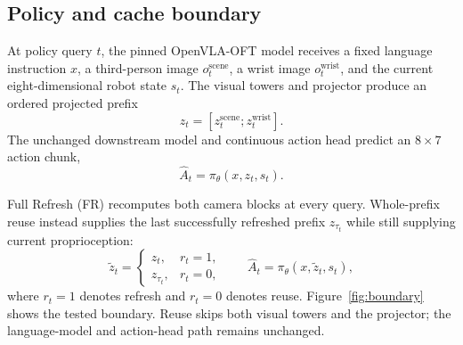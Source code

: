\documentclass[11pt]{article}
\newcommand{\FR}{\textsc{FR}}
\begin{document}
\subsection{Policy and cache boundary}

At policy query $t$, the pinned OpenVLA-OFT model receives a fixed language instruction $x$, a third-person image $o_t^{\mathrm{scene}}$, a wrist image $o_t^{\mathrm{wrist}}$, and the current eight-dimensional robot state $s_t$. The visual towers and projector produce an ordered projected prefix
\begin{equation}
z_t = \left[z_t^{\mathrm{scene}};z_t^{\mathrm{wrist}}\right].
\label{eq:prefix}
\end{equation}
The unchanged downstream model and continuous action head predict an $8\times 7$ action chunk,
\begin{equation}
\hat{A}_t = \pi_\theta(x,z_t,s_t).
\label{eq:policy}
\end{equation}

Full Refresh (\FR) recomputes both camera blocks at every query. Whole-prefix reuse instead supplies the last successfully refreshed prefix $z_{\tau_t}$ while still supplying current proprioception:
\begin{equation}
\tilde z_t =
\begin{cases}
z_t, & r_t=1,\\
z_{\tau_t}, & r_t=0,
\end{cases}
\qquad
\hat{A}_t=\pi_\theta(x,\tilde z_t,s_t),
\label{eq:reuse}
\end{equation}
where $r_t=1$ denotes refresh and $r_t=0$ denotes reuse. Figure~\ref{fig:boundary} shows the tested boundary. Reuse skips both visual towers and the projector; the language-model and action-head path remains unchanged.
\end{document}
